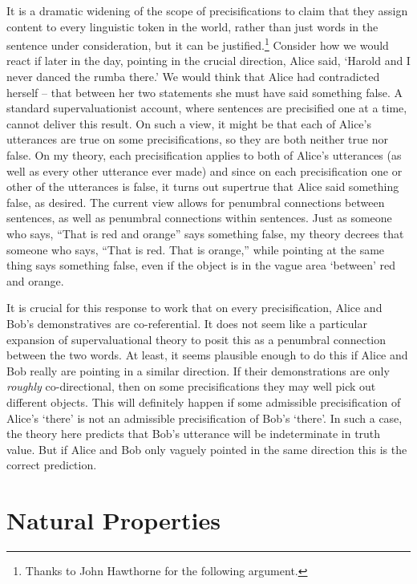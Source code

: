 \documentclass[
  10pt,
  letterpaper,
  DIV=11,
  numbers=noendperiod,
  twoside]{scrartcl}
\begin{document}
It is a dramatic widening of the scope of precisifications to claim that
they assign content to every linguistic token in the world, rather than
just words in the sentence under consideration, but it can be
justified.\footnote{Thanks to John Hawthorne for the following argument.}
Consider how we would react if later in the day, pointing in the crucial
direction, Alice said, `Harold and I never danced the rumba there.' We
would think that Alice had contradicted herself -- that between her two
statements she must have said something false. A standard
supervaluationist account, where sentences are precisified one at a
time, cannot deliver this result. On such a view, it might be that each
of Alice's utterances are true on some precisifications, so they are
both neither true nor false. On my theory, each precisification applies
to both of Alice's utterances (as well as every other utterance ever
made) and since on each precisification one or other of the utterances
is false, it turns out supertrue that Alice said something false, as
desired. The current view allows for penumbral connections between
sentences, as well as penumbral connections within sentences. Just as
someone who says, ``That is red and orange'' says something false, my
theory decrees that someone who says, ``That is red. That is orange,''
while pointing at the same thing says something false, even if the
object is in the vague area `between' red and orange.

It is crucial for this response to work that on every precisification,
Alice and Bob's demonstratives are co-referential. It does not seem like
a particular expansion of supervaluational theory to posit this as a
penumbral connection between the two words. At least, it seems plausible
enough to do this if Alice and Bob really are pointing in a similar
direction. If their demonstrations are only \emph{roughly}
co-directional, then on some precisifications they may well pick out
different objects. This will definitely happen if some admissible
precisification of Alice's `there' is not an admissible precisification
of Bob's `there'. In such a case, the theory here predicts that Bob's
utterance will be indeterminate in truth value. But if Alice and Bob
only vaguely pointed in the same direction this is the correct
prediction.

\section{Natural Properties}\label{natural-properties}
\end{document}
